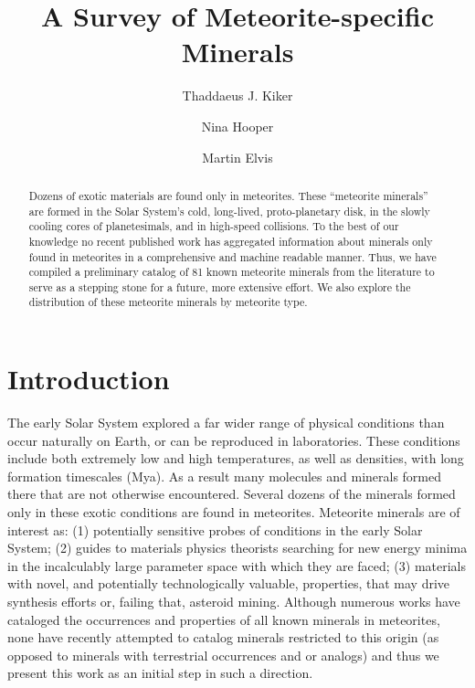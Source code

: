 \documentclass[]{aastex63}
\begin{document}
\title{A Survey of Meteorite-specific Minerals}

\author{Thaddaeus J. Kiker}

\author{Nina Hooper}

\author{Martin Elvis}



\begin{abstract}
Dozens of exotic materials are found only in meteorites. These “meteorite minerals” are formed in the Solar System’s cold, long-lived, proto-planetary disk, in the slowly cooling cores of planetesimals, and in high-speed collisions. To the best of our knowledge no recent published work has aggregated information about minerals only found in meteorites in a comprehensive and machine readable manner. Thus, we have compiled a preliminary catalog of 81 known meteorite minerals from the literature to serve as a stepping stone for a future, more extensive effort. We also explore the distribution of these meteorite minerals by meteorite type.  

\end{abstract}

\section{Introduction} \label{sec:intro}

The early Solar System explored a far wider range of physical conditions than occur naturally
on Earth, or can be reproduced in laboratories. These conditions include both extremely low and high temperatures, as well as densities, with long formation timescales (Mya). As
a result many molecules and minerals formed there that are not otherwise encountered. Several
dozens of the minerals formed only in these exotic conditions are found in meteorites. 
Meteorite minerals are of interest as: (1) potentially sensitive probes of conditions in the early Solar System; (2) guides to materials physics theorists searching for new energy minima in the
incalculably large parameter space with which they are faced; (3) materials with novel, and
potentially technologically valuable, properties, that may drive synthesis efforts or, failing that,
asteroid mining. Although numerous works \citep[e.g.][]{chiRubinReview2017, norton2008} have cataloged the occurrences and properties of all known minerals in meteorites, none have recently attempted to catalog minerals  restricted to this origin (as opposed to minerals with terrestrial occurrences and or analogs) and thus we present this work as an initial step in such a direction. 
\end{document}
